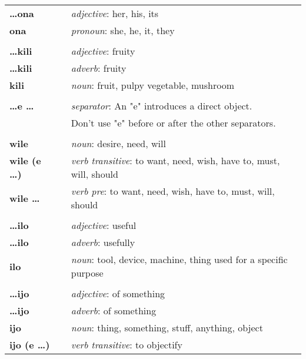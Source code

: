 \begin{supertabular}{p{2,5cm}|ll}
\textbf{\dots ona} && \textit{adjective}: her, his, its \\  %
\textbf{ona} && \textit{pronoun}: she, he, it, they \\ %
 && \\ %
\textbf{\dots kili} && \textit{adjective}: fruity \\ %
\textbf{\dots kili} && \textit{adverb}: fruity \\ %
\textbf{kili} && \textit{noun}: fruit, pulpy vegetable, mushroom \\ %
 && \\ %
\textbf{\dots e \dots} && \textit{separator}: An "e" introduces a direct object. \\ && Don't use "e" before or after the other separators. \\ %
 && \\ %
\textbf{wile} && \textit{noun}: desire, need, will \\ %
\textbf{wile (e \dots)} && \textit{verb transitive}: to want, need, wish, have to, must, will, should \\ %
\textbf{wile \dots} && \textit{verb pre}: to want, need, wish, have to, must, will, should \\ %
 && \\ %
\textbf{\dots ilo} && \textit{adjective}: useful \\ %
\textbf{\dots ilo} && \textit{adverb}: usefully \\ %
\textbf{ilo} && \textit{noun}: tool, device, machine, thing used for a specific purpose \\ %
 && \\ %
\textbf{\dots ijo} && \textit{adjective}: of something \\ %
\textbf{\dots ijo} && \textit{adverb}: of something \\ %
\textbf{ijo} && \textit{noun}: thing, something, stuff, anything, object \\ %
\textbf{ijo (e \dots)} && \textit{verb transitive}: to objectify \\ %

\end{supertabular}
